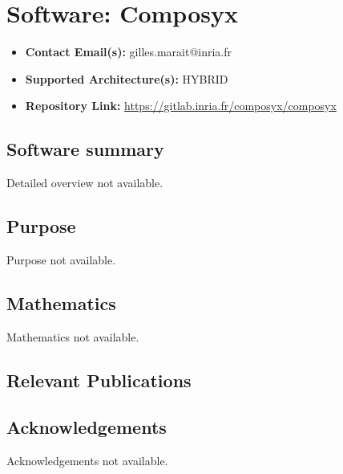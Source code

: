 \section{Software: Composyx}
\label{sec:Composyx:software}

\begin{itemize}
    \item \textbf{Contact Email(s):} gilles.marait@inria.fr
    \item \textbf{Supported Architecture(s):} HYBRID
    \item \textbf{Repository Link:} \href{https://gitlab.inria.fr/composyx/composyx}{https://gitlab.inria.fr/composyx/composyx}
\end{itemize}

\subsection{Software summary}
\label{sec:Composyx:summary}
Detailed overview not available.



\subsection{Purpose}
\label{sec:Composyx:purpose}
Purpose not available.



\subsection{Mathematics}
\label{sec:Composyx:mathematics}
Mathematics not available.


\subsection{Relevant Publications}
\label{sec:Composyx:publications}

\subsection{Acknowledgements}
\label{sec::Composyx:acknowledgements}

Acknowledgements not available.


